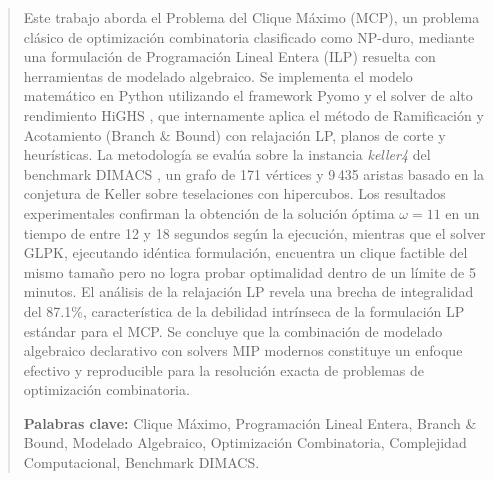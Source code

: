 \begin{abstract}
Este trabajo aborda el Problema del Clique Máximo (MCP), un problema clásico de optimización combinatoria clasificado como NP-duro, mediante una formulación de Programación Lineal Entera (ILP) resuelta con herramientas de modelado algebraico. Se implementa el modelo matemático en Python utilizando el framework Pyomo \parencite{pyomo2021} y el solver de alto rendimiento HiGHS \parencite{highs2024}, que internamente aplica el método de Ramificación y Acotamiento (Branch \& Bound) con relajación LP, planos de corte y heurísticas. La metodología se evalúa sobre la instancia \textit{keller4} del benchmark DIMACS \parencite{mascia_dimacs}, un grafo de 171 vértices y 9\,435 aristas basado en la conjetura de Keller sobre teselaciones con hipercubos. Los resultados experimentales confirman la obtención de la solución óptima $\omega = 11$ en un tiempo de entre 12 y 18 segundos según la ejecución, mientras que el solver GLPK, ejecutando idéntica formulación, encuentra un clique factible del mismo tamaño pero no logra probar optimalidad dentro de un límite de 5 minutos. El análisis de la relajación LP revela una brecha de integralidad del 87.1\%, característica de la debilidad intrínseca de la formulación LP estándar para el MCP. Se concluye que la combinación de modelado algebraico declarativo con solvers MIP modernos constituye un enfoque efectivo y reproducible para la resolución exacta de problemas de optimización combinatoria.

\vspace{0.4cm}
\noindent \textbf{Palabras clave:} Clique Máximo, Programación Lineal Entera, Branch \& Bound, Modelado Algebraico, Optimización Combinatoria, Complejidad Computacional, Benchmark DIMACS.
\end{abstract}